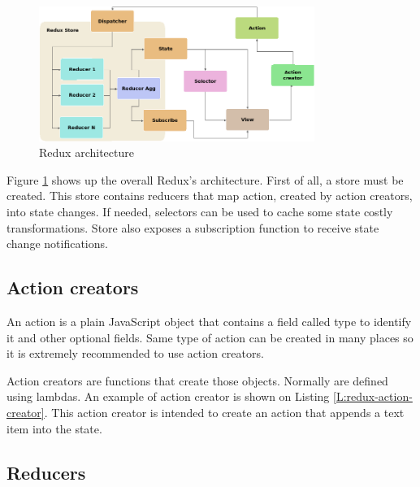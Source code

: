 \begin{figure}[htb]
	\begin{center}
		\includegraphics[width=0.8\textwidth]{./figures/redux.png}
		\caption{Redux architecture}
		\label{F:redux-architecture}
	\end{center}
\end{figure}

Figure \ref{F:redux-architecture} shows up the overall Redux's architecture.
First of all, a store must be created. This store contains reducers that map
action, created by action creators, into state changes. If needed, selectors
can be used to cache some state costly transformations. Store also exposes a
subscription function to receive state change notifications.

\subsection{Action creators}

An action is a plain JavaScript object that contains a field called type to 
identify it and other optional fields. Same type of action can be created in
many places so it is extremely recommended to use action creators.

Action creators are functions that create those objects. Normally are defined
using lambdas. An example of action creator is shown on Listing
\ref{L:redux-action-creator}. This action creator is intended to create an
action that appends a text item into the state.

\begin{codefigure}
\end{codefigure}

\subsection{Reducers}

